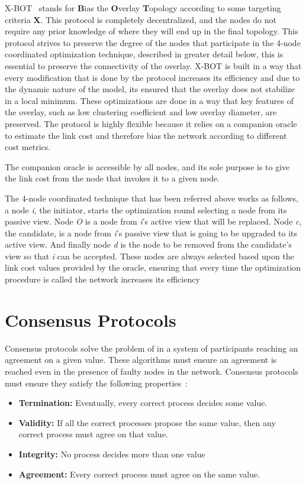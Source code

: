 X-BOT~\cite{xbot} stands for \textbf{B}ias the \textbf{O}verlay \textbf{T}opology
according to some targeting criteria \textbf{X}. This protocol is completely decentralized,
and the nodes do not require any prior knowledge of where they will end up in the final topology. 
This protocol strives to preserve the degree of the nodes that participate in the 4-node coordinated
optimization technique, described in greater detail below, this is essential to preserve
the connectivity of the overlay. X-BOT is built in a way that every modification that is
done by the protocol increases its efficiency and due to the dynamic nature of the model,
its ensured that the overlay does not stabilize in a local minimum. These optimizations
are done in a way that key features of the overlay, such as low clustering coefficient and
low overlay diameter, are preserved. The protocol is highly flexible because it relies on a
companion oracle to estimate the link cost and therefore bias the network according to
different cost metrics.

The companion oracle is accessible by all nodes, and its sole purpose is to give the
link cost from the node that invokes it to a given node.

The 4-node coordinated technique that has been referred above works as follows, a
node \textit{i}, the initiator, starts the optimization round selecting a node from
its passive view. Node \textit{O} is a node from \textit{i}'s active view that
will be replaced. Node \textit{c}, the candidate, is a node from \textit{i}'s passive
view that is going to be upgraded to its active view. And finally node \textit{d}
is the node to be removed from the candidate's view so that \textit{i} can be accepted.
These nodes are always selected based upon the link cost values provided by the oracle,
ensuring that every time the optimization procedure is called the network increases its
efficiency

\section{Consensus Protocols}\label{sec:consensus}

Consensus protocols solve the problem of in a system of participants reaching
an agreement on a given value. These algorithms must ensure an agreement is reached
even in the presence of faulty nodes in the network. Consensus protocols must ensure
they satisfy the following properties~\cite{distributed_systems_concepts}:
\begin{itemize}
  \item \textbf{Termination:} Eventually, every correct process decides some value.
  \item \textbf{Validity:} If all the correct processes propose the same value,
then any correct process must agree on that value.
  \item \textbf{Integrity:} No process decides more than one value
  \item \textbf{Agreement:} Every correct process must agree on the same value.
\end{itemize}

